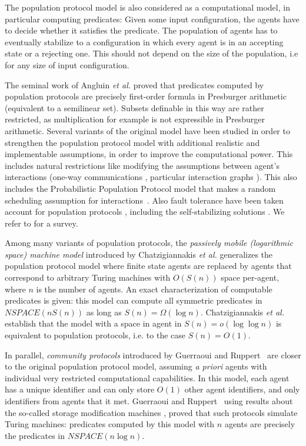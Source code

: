 \documentclass[UKenglish]{llncs}
\begin{document}
The population protocol model is also considered as a computational model, in
particular computing predicates: Given some input configuration, the
agents have to decide whether it satisfies the predicate.
The population of agents has to eventually stabilize to a
configuration in which every agent is in an accepting state or a
rejecting one. This should not depend on the size of the population,
i.e for any
size of input configuration. 

The seminal work of Angluin \emph{et
al.} \cite{angluin2007cpp,AspnesADFP2004} proved that predicates
computed by population protocols are precisely first-order formula in Presburger arithmetic
(equivalent to a semilinear set).  Subsets definable
in this way are rather restricted, as multiplication for example is not
expressible in Presburger
arithmetic. 
Several variants
of the original model have been 
studied in order to strengthen the population protocol model with
additional realistic and implementable assumptions, in order to improve the
computational power. This includes natural restrictions like modifying the assumptions between
agent's interactions (one-way communications \cite{angluin2007cpp},
particular interaction graphs \cite{AngluinACFJP2005}).  This also
includes the 
Probabilistic Population Protocol model that makes a random scheduling
assumption for interactions~\cite{AspnesADFP2004}.  Also fault tolerance have been taken account  for population protocols
\cite{Delporte-GalletFGR06}, including the self-stabilizing
solutions \cite{OPODIS}.  We refer to
\cite{PopProtocolsEATCS,ChatzigiannakisMS10} for a 
survey.



Among many variants of population protocols, the \emph{passively mobile
(logarithmic space) machine model} introduced by Chatzigiannakis \emph{et
  al.}  \cite{chatzigiannakis2011passively} generalizes  the population protocol model where finite state
agents are replaced by agents that correspond to arbitrary Turing
machines with $O(S (n))$ space per-agent, where $n$ is the number
of agents.  An exact characterization
\cite{chatzigiannakis2011passively} of computable predicates is given: this model can compute all symmetric predicates in $NSPACE(n S (n))$
as long as $S (n) = \Omega (\log n)$.  Chatzigiannakis \emph{et al.}
establish that  the
model with a space in agent in  $S(n)=o(\log \log n)$ is equivalent to population protocols, i.e. to the case
$S(n)=O(1)$. 


In parallel, \emph{community protocols} introduced by Guerraoui and
Ruppert~\cite{guerraoui2009names} are closer to the original
population protocol model, assuming \textit{a priori} agents with
individual very restricted computational capabilities.  In this model,
each agent has a unique
identifier and  can only store $O(1)$ other agent
identifiers, and only identifiers from agents that it met.  Guerraoui
and Ruppert~\cite{guerraoui2009names} using results about the
so-called storage modification machines \cite{schonhage1980storage},   proved
that such protocols 
simulate  Turing machines:  predicates computed by this
model with $n$ agents are precisely the predicates in $NSPACE(n \log n)$.
\end{document}
